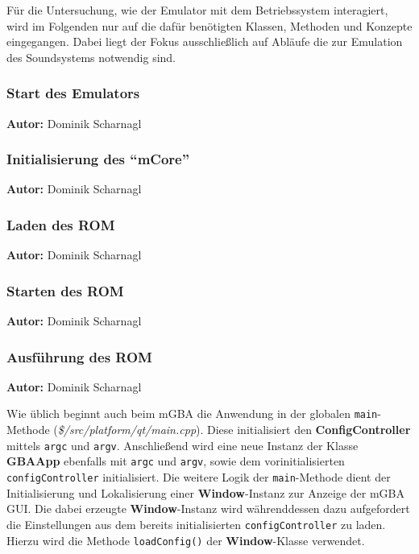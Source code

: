 \documentclass[11pt,a4paper]{scrartcl}
\newcommand{\AutorDominik} {
    \vspace{-4mm}
    \large \textbf{Autor:} Dominik Scharnagl \normalsize
    \vspace{2mm}
}
\begin{document}
F\"ur die Untersuchung, wie der Emulator mit dem Betriebssystem interagiert, wird im Folgenden nur auf die daf\"ur ben\"otigten Klassen, Methoden und Konzepte eingegangen. Dabei liegt der Fokus ausschlie{\ss}lich auf Abl\"aufe die zur Emulation des Soundsystems notwendig sind.

\subsubsection{Start des Emulators}
\AutorDominik

\subsubsection{Initialisierung des \enquote{mCore}}
\AutorDominik

\subsubsection{Laden des ROM}
\AutorDominik

\subsubsection{Starten des ROM}
\AutorDominik

\subsubsection{Ausf\"uhrung des ROM}
\AutorDominik











Wie \"ublich beginnt auch beim mGBA die Anwendung in der globalen \verb|main|-Methode (\textit{\$/src/platform/qt/main.cpp}). Diese initialisiert den \textbf{ConfigController} mittels \verb|argc| und \verb|argv|. Anschlie{\ss}end wird eine neue Instanz der Klasse \textbf{GBAApp} ebenfalls mit \verb|argc| und \verb|argv|, sowie dem vorinitialisierten \verb|configController| initialisiert. Die weitere Logik der \verb|main|-Methode dient der Initialisierung und Lokalisierung einer \textbf{Window}-Instanz zur Anzeige der mGBA GUI. Die dabei erzeugte \textbf{Window}-Instanz wird w\"ahrenddessen dazu aufgefordert die Einstellungen aus dem bereits initialisierten \verb|configController| zu laden. Hierzu wird die Methode \verb|loadConfig()| der \textbf{Window}-Klasse verwendet.
\end{document}
